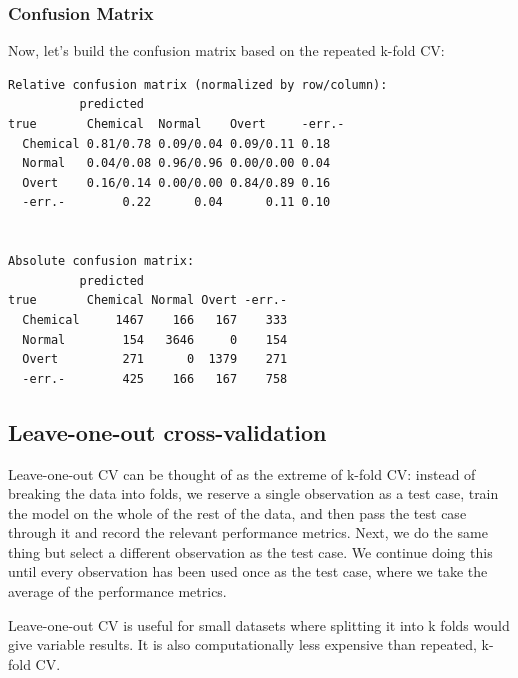 \documentclass[
]{article}
\newenvironment{Shaded}{\begin{snugshade}}{\end{snugshade}}
\newcommand{\AttributeTok}[1]{\textcolor[rgb]{0.13,0.29,0.53}{#1}}
\newcommand{\ConstantTok}[1]{\textcolor[rgb]{0.56,0.35,0.01}{#1}}
\newcommand{\FunctionTok}[1]{\textcolor[rgb]{0.13,0.29,0.53}{\textbf{#1}}}
\newcommand{\NormalTok}[1]{#1}
\newcommand{\SpecialCharTok}[1]{\textcolor[rgb]{0.81,0.36,0.00}{\textbf{#1}}}
\begin{document}
\subsubsection{Confusion Matrix}\label{confusion-matrix}

Now, let's build the confusion matrix based on the repeated k-fold CV:

\begin{Shaded}
\end{Shaded}

\begin{verbatim}
Relative confusion matrix (normalized by row/column):
          predicted
true       Chemical  Normal    Overt     -err.-   
  Chemical 0.81/0.78 0.09/0.04 0.09/0.11 0.18     
  Normal   0.04/0.08 0.96/0.96 0.00/0.00 0.04     
  Overt    0.16/0.14 0.00/0.00 0.84/0.89 0.16     
  -err.-        0.22      0.04      0.11 0.10     


Absolute confusion matrix:
          predicted
true       Chemical Normal Overt -err.-
  Chemical     1467    166   167    333
  Normal        154   3646     0    154
  Overt         271      0  1379    271
  -err.-        425    166   167    758
\end{verbatim}

\subsection{Leave-one-out
cross-validation}\label{leave-one-out-cross-validation}

Leave-one-out CV can be thought of as the extreme of k-fold CV: instead
of breaking the data into folds, we reserve a single observation as a
test case, train the model on the whole of the rest of the data, and
then pass the test case through it and record the relevant performance
metrics. Next, we do the same thing but select a different observation
as the test case. We continue doing this until every observation has
been used once as the test case, where we take the average of the
performance metrics.

Leave-one-out CV is useful for small datasets where splitting it into k
folds would give variable results. It is also computationally less
expensive than repeated, k-fold CV.
\end{document}
